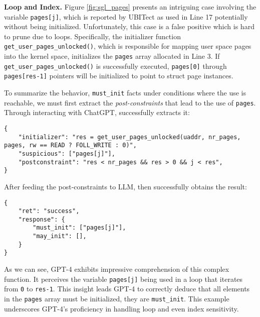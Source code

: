 

\vspace{3pt}
\noindent
\textbf{Loop and Index.} Figure \ref{fig:sgl_pages} presents an intriguing case involving the variable \texttt{pages[j]}, which is reported by UBITect as used in Line 17 potentially without being initialized. Unfortunately, this case is a false positive which is hard to prune due to loops. Specifically, the initializer function \texttt{get\_user\_pages\_unlocked()}, which is responsible for mapping user space pages into the kernel space, initializes the \texttt{pages} array allocated in Line 3. If \texttt{get\_user\_pages\_unlocked()} is successfully executed, \texttt{pages[0]} through \texttt{pages[res-1]} pointers will be initialized to point to struct page instances. 

To summarize the behavior, \ie \texttt{must\_init} facts under conditions where the use is reachable,
we must first extract the \textit{post-constraints} that lead to the use of \texttt{pages}. Through interacting with ChatGPT, \work successfully extracts it:
\begin{lstlisting}[numbers=none]
{
    "initializer": "res = get_user_pages_unlocked(uaddr, nr_pages, pages, rw == READ ? FOLL_WRITE : 0)",
    "suspicious": ["pages[j]"],
    "postconstraint": "res < nr_pages && res > 0 && j < res",
}
\end{lstlisting}

After feeding the post-constraints to LLM, \work then successfully obtains the result:

\begin{lstlisting}[numbers=none]
{
    "ret": "success",
    "response": {
        "must_init": ["pages[j]"],
        "may_init": [],
    }
}
\end{lstlisting}

As we can see, GPT-4 exhibits impressive comprehension of this complex function. 
It perceives the variable \texttt{pages[j]} being used in a loop that iterates from \texttt{0} to \texttt{res-1}. This insight leads GPT-4 to correctly deduce that all elements in the \texttt{pages} array must be initialized, \ie they are \texttt{must\_init}. This example underscores GPT-4's proficiency in handling loop and even index sensitivity.

